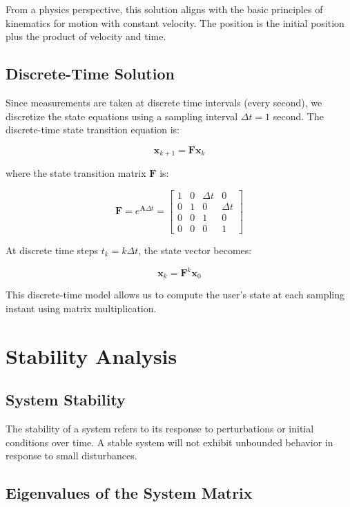 \documentclass[12pt]{article}
\begin{document}
From a physics perspective, this solution aligns with the basic principles of kinematics for motion with constant velocity. The position is the initial position plus the product of velocity and time.

\subsection{Discrete-Time Solution}

Since measurements are taken at discrete time intervals (every second), we discretize the state equations using a sampling interval \( \Delta t = 1 \) second. The discrete-time state transition equation is:

\[
\mathbf{x}_{k+1} = \mathbf{F} \mathbf{x}_k
\]

where the state transition matrix \( \mathbf{F} \) is:

\[
\mathbf{F} = e^{\mathbf{A} \Delta t} = \begin{bmatrix}
1 & 0 & \Delta t & 0 \\
0 & 1 & 0 & \Delta t \\
0 & 0 & 1 & 0 \\
0 & 0 & 0 & 1
\end{bmatrix}
\]

At discrete time steps \( t_k = k \Delta t \), the state vector becomes:

\[
\mathbf{x}_k = \mathbf{F}^k \mathbf{x}_0
\]

This discrete-time model allows us to compute the user's state at each sampling instant using matrix multiplication.

\section{Stability Analysis}

\subsection{System Stability}

The stability of a system refers to its response to perturbations or initial conditions over time. A stable system will not exhibit unbounded behavior in response to small disturbances.

\subsection{Eigenvalues of the System Matrix}
\end{document}
